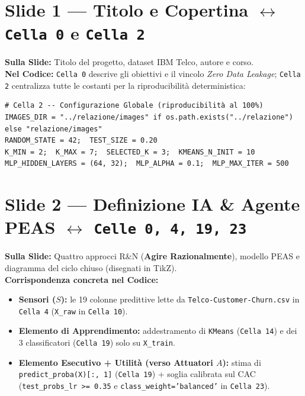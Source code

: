 \documentclass[10pt, a4paper]{article}
\begin{document}
\section*{Slide 1 --- Titolo e Copertina $\leftrightarrow$ \texttt{Cella 0} e \texttt{Cella 2}}
\noindent\textbf{Sulla Slide:} Titolo del progetto, dataset IBM Telco, autore e corso. \\
\textbf{Nel Codice:} \texttt{Cella 0} descrive gli obiettivi e il vincolo \textit{Zero Data Leakage}; \texttt{Cella 2} centralizza tutte le costanti per la riproducibilità deterministica:
\begin{lstlisting}
# Cella 2 -- Configurazione Globale (riproducibilità al 100%)
IMAGES_DIR = "../relazione/images" if os.path.exists("../relazione") else "relazione/images"
RANDOM_STATE = 42;  TEST_SIZE = 0.20
K_MIN = 2;  K_MAX = 7;  SELECTED_K = 3;  KMEANS_N_INIT = 10
MLP_HIDDEN_LAYERS = (64, 32);  MLP_ALPHA = 0.1;  MLP_MAX_ITER = 500
\end{lstlisting}

\section*{Slide 2 --- Definizione IA \& Agente PEAS $\leftrightarrow$ \texttt{Celle 0, 4, 19, 23}}
\noindent\textbf{Sulla Slide:} Quattro approcci R\&N (\textbf{Agire Razionalmente}), modello PEAS e diagramma del ciclo chiuso (disegnati in TikZ).\\
\textbf{Corrispondenza concreta nel Codice:}
\begin{itemize}
    \item \textbf{Sensori ($S$):} le 19 colonne predittive lette da \texttt{Telco-Customer-Churn.csv} in \texttt{Cella 4} (\texttt{X\_raw} in \texttt{Cella 10}).
    \item \textbf{Elemento di Apprendimento:} addestramento di \texttt{KMeans} (\texttt{Cella 14}) e dei 3 classificatori (\texttt{Cella 19}) solo su \texttt{X\_train}.
    \item \textbf{Elemento Esecutivo + Utilità (verso Attuatori $A$):} stima di \texttt{predict\_proba(X)[:, 1]} (\texttt{Cella 19}) + soglia calibrata sul CAC (\texttt{test\_probs\_lr >= 0.35} e \texttt{class\_weight='balanced'} in \texttt{Cella 23}).
\end{itemize}
\end{document}
